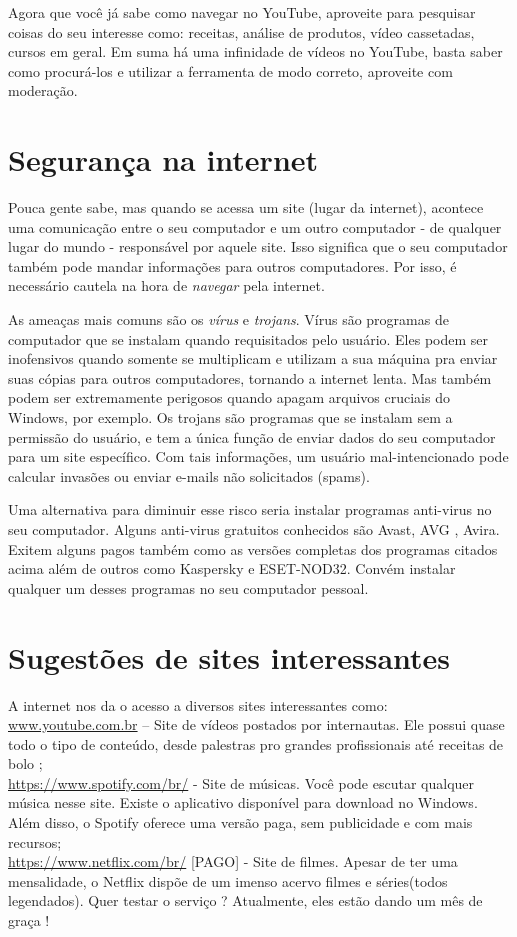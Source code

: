 \documentclass[hidelinks,12pt]{article}
\begin{document}
	Agora que você já sabe como navegar no YouTube, aproveite para pesquisar coisas do seu interesse como: receitas, análise de produtos, vídeo cassetadas, cursos em geral. Em suma há uma infinidade de vídeos no YouTube, basta saber como procurá-los e utilizar a ferramenta de modo correto, aproveite com moderação.
	

	\section{Segurança na internet}

	Pouca gente sabe, mas quando se acessa um site (lugar da internet), acontece uma comunicação entre o seu computador e um outro computador - de qualquer lugar do mundo - responsável por aquele site. Isso significa que o seu computador também pode mandar informações para outros computadores. Por isso, é necessário cautela na hora de \textit{navegar} pela internet.

	As ameaças mais comuns são os \textit{vírus} e \textit{trojans}. Vírus são programas de computador que se instalam quando requisitados pelo usuário. Eles podem ser inofensivos quando somente se multiplicam e utilizam a sua máquina pra enviar suas cópias para outros computadores, tornando a internet lenta. Mas também podem ser extremamente perigosos quando apagam arquivos cruciais do Windows, por exemplo. Os trojans são programas que se instalam sem a permissão do usuário, e tem a única função de enviar dados do seu computador para um site específico. Com tais informações, um usuário mal-intencionado pode calcular invasões ou enviar e-mails não solicitados (spams).

	Uma alternativa para diminuir esse risco seria instalar programas anti-virus no seu computador. Alguns anti-virus gratuitos conhecidos são Avast, AVG , Avira. Exitem alguns pagos também como as versões completas dos programas citados acima além de outros como Kaspersky e ESET-NOD32. Convém instalar qualquer um desses programas no seu computador pessoal.


	\section{Sugestões de sites interessantes}
		A internet nos da o acesso a diversos sites interessantes como:\\

		\url{www.youtube.com.br} – Site de vídeos postados por internautas. Ele possui quase todo o tipo de conteúdo, desde palestras pro grandes profissionais até receitas de bolo ;\\

		\url{https://www.spotify.com/br/} - Site de músicas. Você pode escutar qualquer música nesse site. Existe o aplicativo disponível para download no Windows. Além disso, o Spotify oferece uma versão paga, sem publicidade e com mais recursos;\\

		\url{https://www.netflix.com/br/} [PAGO] - Site de filmes. Apesar de ter uma mensalidade, o Netflix dispõe de um imenso acervo filmes e séries(todos legendados). Quer testar o serviço ? Atualmente, eles estão dando um mês de graça !
\end{document}
